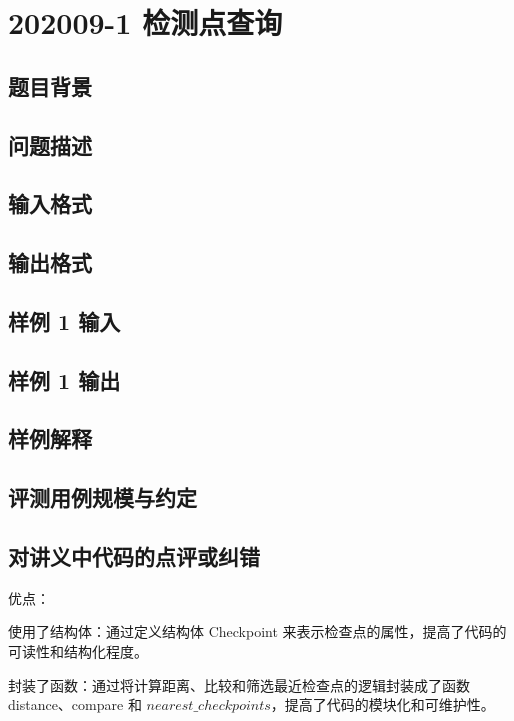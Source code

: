\section{202009-1 检测点查询}

\subsection{题目背景}

\subsection{问题描述}

\subsection{输入格式}

\subsection{输出格式}

\subsection{样例 1 输入}

\subsection{样例 1 输出}

\subsection{样例解释}

\subsection{评测用例规模与约定}

\subsection{对讲义中代码的点评或纠错}
 
优点：

使用了结构体：通过定义结构体 Checkpoint 来表示检查点的属性，提高了代码的可读性和结构化程度。

封装了函数：通过将计算距离、比较和筛选最近检查点的逻辑封装成了函数 distance、compare 和 $nearest\_checkpoints$，提高了代码的模块化和可维护性。

